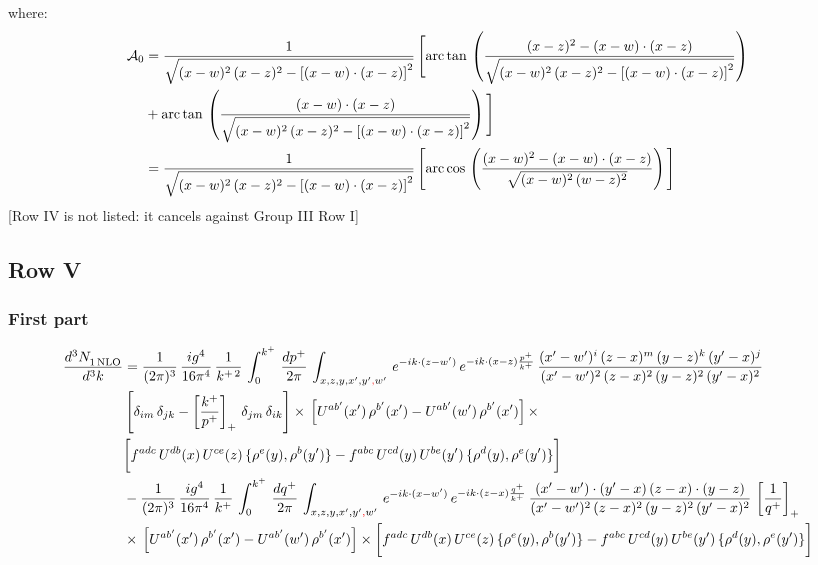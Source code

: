 \documentclass[9pt]{article}
\numberwithin{equation}{section}
\begin{document}
where: \begin{align}
\mathcal{A}_{0} & = \frac{1}{\sqrt{(x-w)^{2}\,(x-z)^{2}-\left[(x-w)\cdot (x-z)\right]^{2}}}\, \Bigg[\mathrm{arc\,tan}\,\left(\frac{(x-z)^{2}-(x-w)\cdot (x-z)}{\sqrt{(x-w)^{2}\,(x-z)^{2}-\left[(x-w)\cdot (x-z)\right]^{2}}}\right)\notag \\ & + \mathrm{arc\,tan}\,\left(\frac{(x-w)\cdot (x-z)}{\sqrt{(x-w)^{2}\,(x-z)^{2}-\left[(x-w)\cdot (x-z)\right]^{2}}}\right) \Bigg]\notag \\ & = \frac{1}{\sqrt{(x-w)^{2}\,(x-z)^{2}-\left[(x-w)\cdot (x-z)\right]^{2}}}\, \Bigg[\mathrm{arc\,cos}\,\left(\frac{(x-w)^{2}-(x-w)\cdot (x-z)}{\sqrt{(x-w)^{2}\,(w-z)^{2}}}\right)\Bigg]
\end{align} {\color{red}[Row IV is not listed: it cancels against Group III Row I]}\par\noindent
\subsection{Row V}
\subsubsection*{First part}
\begin{align}
     \frac{d^{3}N_{1\,\rm NLO}^{\rm}}{d^{3}k}  & =  \frac{1}{(2\pi)^{3}}\, \frac{ig^{4}}{16\pi^{4}}\, \frac{1}{k^{+\,2}}\,\int_{0}^{k^{+}}\, \frac{dp^{+}}{2\pi}\,\int_{x,z,y,x',y'{\color{red},}w'}\,e^{-ik\cdot (z-w^\prime)}\,e^{-ik\cdot (x-z)\frac{p^{+}}{k^{+}}}\,\frac{(x'-w')^{i}\,(z-x)^{m}\,(y-z)^{k}\,(y'-x)^{j}}{(x'-w')^{2}\,(z-x)^{2}\,(y-z)^{2}\,(y'-x)^{2}}\,\notag \\ & \left[\delta_{im}\,\delta_{jk}-\left[\frac{k^{+}}{p^{+}}\right]_{+}\, \delta_{jm}\,\delta_{ik}\right]\times\, \left[U^{ab'}(x')\,\rho^{b'}(x')-U^{ab'}(w')\,\rho^{b'}(x')\right]\times\notag \\ & \bigg[f^{adc}\,U^{db}(x)\,U^{ce}(z)\, \{\rho^{e}(y),\rho^{b}(y')\}-f^{abc}\,U^{cd}(y)\,U^{be}(y')\, \{\rho^{d}(y),\rho^{e}(y')\}\bigg] \notag \\ & -\frac{1}{(2\pi)^{3}}\, \frac{ig^{4}}{16\pi^{4}}\, \frac{1}{k^{+}}\,\int_{0}^{k^{+}}\, \frac{dq^{+}}{2\pi}\,\int_{x,z,y,x',y'{\color{red},}w'}\,e^{-ik\cdot (x-w^\prime)}\,e^{-ik\cdot (z-x)\frac{q^{+}}{k^{+}}}\,\frac{(x'-w')\cdot (y'-x)\,(z-x)\cdot (y-z)}{(x'-w')^{2}\,(z-x)^{2}\,(y-z)^{2}\,(y'-x)^{2}}\,\left[\frac{1}{q^{+}}\right]_{+}\notag \\ & \times\, \left[U^{ab'}(x')\,\rho^{b'}(x')-U^{ab'}(w')\,\rho^{b'}(x')\right]\times \bigg[f^{adc}\,U^{db}(x)\,U^{ce}(z)\, \{\rho^{e}(y),\rho^{b}(y')\}-f^{abc}\,U^{cd}(y)\,U^{be}(y')\, \{\rho^{d}(y),\rho^{e}(y')\}\bigg]
\end{align}
\end{document}
